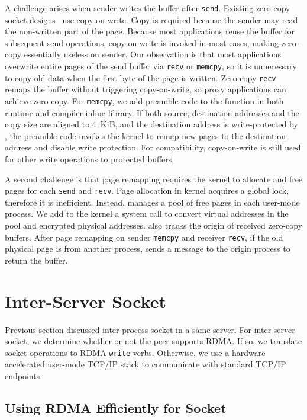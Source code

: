 A challenge arises when sender writes the buffer after \texttt{send}.
Existing zero-copy socket designs~\cite{thadani1995efficient,chu1996zero} use copy-on-write. Copy is required because the sender may read the non-written part of the page.
Because most applications reuse the buffer for subsequent send operations, copy-on-write is invoked in most cases, making zero-copy essentially useless on sender.
Our observation is that most applications overwrite entire pages of the send buffer via \texttt{recv} or \texttt{memcpy}, so it is unnecessary to copy old data when the first byte of the page is written.
Zero-copy \texttt{recv} remaps the buffer without triggering copy-on-write, so proxy applications can achieve zero copy.
For \texttt{memcpy}, we add preamble code to the function in both \libipc{} runtime and compiler inline library. If both source, destination addresses and the copy size are aligned to 4~KiB, and the destination address is write-protected by \libipc{}, the preamble code invokes the kernel to remap new pages to the destination address and disable write protection.
For compatibility, copy-on-write is still used for other write operations to protected buffers.

A second challenge is that page remapping requires the kernel to allocate and free pages for each \texttt{send} and \texttt{recv}. Page allocation in kernel acquires a global lock, therefore it is inefficient. Instead, \libipc{} manages a pool of free pages in each user-mode process.
We add to the kernel a system call to convert virtual addresses in the pool and encrypted physical addresses.
\libipc{} also tracks the origin of received zero-copy buffers.
After page remapping on sender \texttt{memcpy} and receiver \texttt{recv}, if the old physical page is from another process, \libipc{} sends a message to the origin process to return the buffer.


\section{Inter-Server Socket}
\label{sec:rdma}

Previous section discussed inter-process socket in a same server. For inter-server socket, we determine whether or not the peer supports RDMA. If so, we translate socket operations to RDMA \texttt{write} verbs. Otherwise, we use a hardware accelerated user-mode TCP/IP stack to communicate with standard TCP/IP endpoints.

\subsection{Using RDMA Efficiently for Socket}

